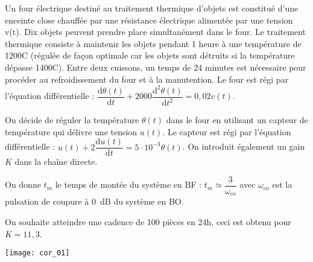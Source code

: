 \setcounter{exo}{0}
\begin{multicols}{2}




Un four électrique destiné au traitement thermique d'objets est constitué d'une enceinte close chauffée par une résistance électrique alimentée par une tension v(t). Dix objets peuvent prendre place simultanément dans le four. Le traitement thermique consiste à maintenir les objets pendant 1 heure à une température de 1200\degres C (régulée de façon optimale car les objets sont détruits si la température dépasse  1400\degres C).
Entre deux cuissons, un temps de 24 minutes est nécessaire pour procéder au refroidissement du four et à la manutention.
Le four est régi par l’équation différentielle : $\dfrac{\text{d}\theta(t)}{\text{d}t}+2000\dfrac{\text{d}^2\theta(t)}{\text{d}t^2}=0,02 v(t)$.



On décide de réguler la température $\theta(t)$ dans le four en utilisant un capteur de température qui délivre une tension $u(t)$. Le capteur est régi par l’équation différentielle :  $u(t)+2\dfrac{\text{d}u(t)}{\text{d}t}=5\cdot 10^{-3} \theta(t)$. On introduit également un gain $K$ dans la chaîne directe.



On donne $t_m$ le temps de montée du système en BF : $t_m\simeq \dfrac{3}{\omega_{\text{co}}}$ avec $\omega_{\text{co}}$ est la pulsation de coupure à \SI{0}{dB} du système en BO.  



On souhaite atteindre une cadence de 100 pièces en 24h, ceci est obtenu pour $K=11,3$.




\end{multicols}
\ifprof
\newpage
\begin{center}
\texttt{[image: cor\_01]}
\end{center}
\else
\fi
